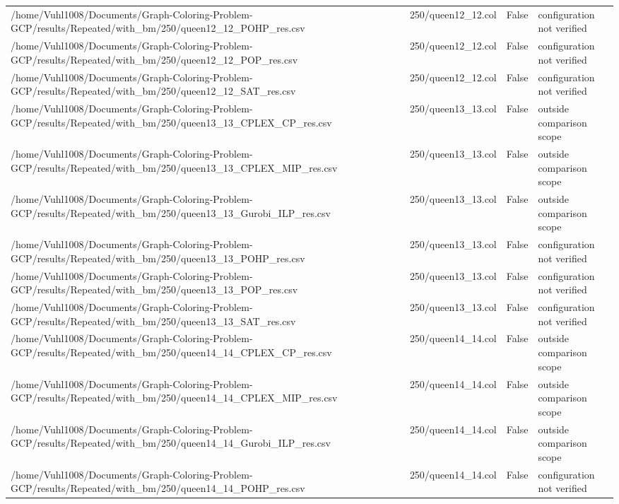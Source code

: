 \begin{table}[htbp]
\begin{tabular}{llll}
/home/Vuhl1008/Documents/Graph-Coloring-Problem-GCP/results/Repeated/with\_bm/250/queen12\_12\_POHP\_res.csv & 250/queen12\_12.col & False & configuration not verified \\
/home/Vuhl1008/Documents/Graph-Coloring-Problem-GCP/results/Repeated/with\_bm/250/queen12\_12\_POP\_res.csv & 250/queen12\_12.col & False & configuration not verified \\
/home/Vuhl1008/Documents/Graph-Coloring-Problem-GCP/results/Repeated/with\_bm/250/queen12\_12\_SAT\_res.csv & 250/queen12\_12.col & False & configuration not verified \\
/home/Vuhl1008/Documents/Graph-Coloring-Problem-GCP/results/Repeated/with\_bm/250/queen13\_13\_CPLEX\_CP\_res.csv & 250/queen13\_13.col & False & outside comparison scope \\
/home/Vuhl1008/Documents/Graph-Coloring-Problem-GCP/results/Repeated/with\_bm/250/queen13\_13\_CPLEX\_MIP\_res.csv & 250/queen13\_13.col & False & outside comparison scope \\
/home/Vuhl1008/Documents/Graph-Coloring-Problem-GCP/results/Repeated/with\_bm/250/queen13\_13\_Gurobi\_ILP\_res.csv & 250/queen13\_13.col & False & outside comparison scope \\
/home/Vuhl1008/Documents/Graph-Coloring-Problem-GCP/results/Repeated/with\_bm/250/queen13\_13\_POHP\_res.csv & 250/queen13\_13.col & False & configuration not verified \\
/home/Vuhl1008/Documents/Graph-Coloring-Problem-GCP/results/Repeated/with\_bm/250/queen13\_13\_POP\_res.csv & 250/queen13\_13.col & False & configuration not verified \\
/home/Vuhl1008/Documents/Graph-Coloring-Problem-GCP/results/Repeated/with\_bm/250/queen13\_13\_SAT\_res.csv & 250/queen13\_13.col & False & configuration not verified \\
/home/Vuhl1008/Documents/Graph-Coloring-Problem-GCP/results/Repeated/with\_bm/250/queen14\_14\_CPLEX\_CP\_res.csv & 250/queen14\_14.col & False & outside comparison scope \\
/home/Vuhl1008/Documents/Graph-Coloring-Problem-GCP/results/Repeated/with\_bm/250/queen14\_14\_CPLEX\_MIP\_res.csv & 250/queen14\_14.col & False & outside comparison scope \\
/home/Vuhl1008/Documents/Graph-Coloring-Problem-GCP/results/Repeated/with\_bm/250/queen14\_14\_Gurobi\_ILP\_res.csv & 250/queen14\_14.col & False & outside comparison scope \\
/home/Vuhl1008/Documents/Graph-Coloring-Problem-GCP/results/Repeated/with\_bm/250/queen14\_14\_POHP\_res.csv & 250/queen14\_14.col & False & configuration not verified \\

\end{tabular}
\end{table}
